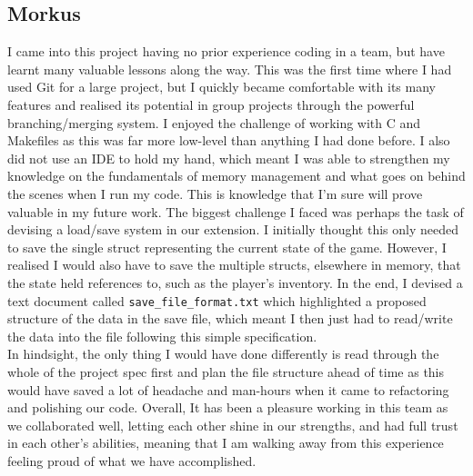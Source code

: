 \documentclass[10pt]{article}
\begin{document}
\subsection*{Morkus}

I came into this project having no prior experience coding in a team, but have learnt many valuable lessons along the way. This was the first time where I had used Git for a large project, but I quickly became comfortable with its many features and realised its potential in group projects through the powerful branching/merging system. I enjoyed the challenge of working with C and Makefiles as this was far more low-level than anything I had done before. I also did not use an IDE to hold my hand, which meant I was able to strengthen my knowledge on the fundamentals of memory management and what goes on behind the scenes when I run my code. This is knowledge that I’m sure will prove valuable in my future work. The biggest challenge I faced was perhaps the task of devising a load/save system in our extension. I initially thought this only needed to save the single struct representing the current state of the game. However, I realised I would also have to save the multiple structs, elsewhere in memory, that the state held references to, such as the player’s inventory. In the end, I devised a text document called {\tt save\_file\_format.txt} which highlighted a proposed structure of the data in the save file, which meant I then just had to read/write the data into the file following this simple specification. 
\\

In hindsight, the only thing I would have done differently is read through the whole of the project spec first and plan the file structure ahead of time as this would have saved a lot of headache and man-hours when it came to refactoring and polishing our code. Overall, It has been a pleasure working in this team as we collaborated well, letting each other shine in our strengths, and had full trust in each other’s abilities, meaning that I am walking away from this experience feeling proud of what we have accomplished.
\end{document}
